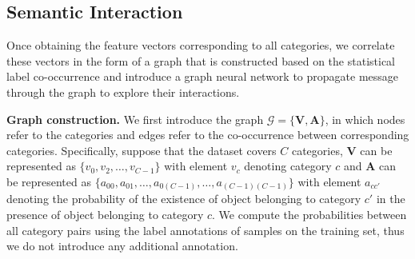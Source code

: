 \documentclass[10pt,twocolumn,letterpaper]{article}
\begin{document}
\subsection{Semantic Interaction}
\label{sec:SI}
Once obtaining the feature vectors corresponding to all categories, we correlate these vectors in the form of a graph that is constructed based on the statistical label co-occurrence and introduce a graph neural network to propagate message through the graph to explore their interactions.

\noindent\textbf{Graph construction.} We first introduce the graph $\mathcal{G}=\{\mathbf{V}, \mathbf{A}\}$, in which nodes refer to the categories and edges refer to the co-occurrence between corresponding categories. Specifically, suppose that the dataset covers $C$ categories, $\mathbf{V}$ can be represented as $\{v_0, v_2, \dots, v_{C-1}\}$ with element $v_c$ denoting category $c$ and $\mathbf{A}$ can be represented as $\{a_{00}, a_{01}, \dots, a_{0(C-1)}, \dots, a_{(C-1)(C-1)}\}$ with element $a_{cc'}$ denoting the probability of the existence of object belonging to category $c'$ in the presence of object belonging to category $c$. We compute the probabilities between all category pairs using the label annotations of samples on the training set, thus we do not introduce any additional annotation.
\end{document}

